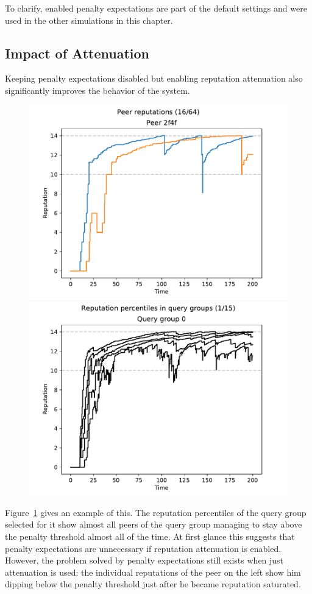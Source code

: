 To clarify, enabled penalty expectations are part of the default settings and
were used in the other simulations in this chapter.

\subsection{Impact of Attenuation}
Keeping penalty expectations disabled but enabling reputation attenuation also
significantly improves the behavior of the system.

\begin{figure}[t]
\centering
\includegraphics[width=0.5\columnwidth]{figures/expectations_off_peer_reps_16_of_64}%
\includegraphics[width=0.5\columnwidth]{figures/expectations_off_rep_percs_1_of_15}
\label{fig:penalty_expectations_off_peer_reps_percs}
\end{figure}

Figure~\ref{fig:penalty_expectations_off_peer_reps_percs} gives an example of
this. The reputation percentiles of the query group selected for it show almost
all peers of the query group managing to stay above the penalty threshold almost
all of the time. At first glance this suggests that penalty expectations are
unnecessary if reputation attenuation is enabled.  However, the problem solved
by penalty expectations still exists when just attenuation is used: the
individual reputations of the peer on the left show him dipping below the
penalty threshold just after he became reputation saturated.

